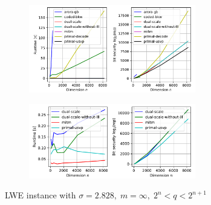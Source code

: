 \begin{figure}[h!]
    \centering
    \begin{subfigure}{1\textwidth}
        \centering
        \includegraphics[width=0.8\textwidth]{graphics/LWE_stddev=2,828_plots_200s.pdf}
    \end{subfigure}
    \begin{subfigure}{1\textwidth}
        \centering
        \includegraphics[width=0.8\textwidth]{graphics/LWE_stddev=2,828_plots_1s.pdf}
    \end{subfigure}
    \caption{LWE instance with $\sigma=2.828,\; m=\infty, \; 2^{n} < q < 2^{n+1}$}\label{fig:LWE-algs-large}
\end{figure}




